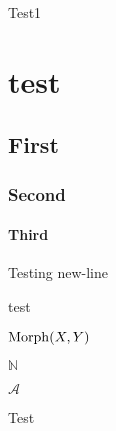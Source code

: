 \documentclass{amsbook}
\begin{document}
Test1
\chapter{test}
\section{First}
\subsection{Second}
\subsubsection{Third}


\begin{thm}[Test]
Testing new-line

\begin{lem}[Test1]
test
\end{lem}

\end{thm}

$ \operatorname{Morph}(X,Y) $

$ \mathbb{N} $

$ \mathscr{A} $


\begin{exr}

Test

\end{exr}
\end{document}
